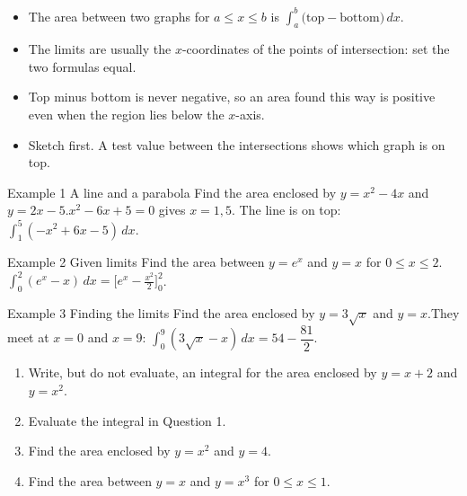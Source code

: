 \documentclass[11pt]{article}
\begin{document}

\begin{ideabox}
\begin{itemize}[leftmargin=*,itemsep=2pt,topsep=2pt]
  \item The area between two graphs for $a\le x\le b$ is $\displaystyle\int_{a}^{b}\big(\text{top}-\text{bottom}\big)\,dx$.
  \item The limits are usually the $x$-coordinates of the points of intersection: set the two formulas equal.
  \item Top minus bottom is never negative, so an area found this way is positive even when the region lies below the $x$-axis.
  \item Sketch first. A test value between the intersections shows which graph is on top.
\end{itemize}
\end{ideabox}

\begin{example}{Example 1 \textperiodcentered{} A line and a parabola}
Find the area enclosed by $y=x^2-4x$ and $y=2x-5$.\soln $x^2-6x+5=0$ gives $x=1,5$. The line is on top: $\displaystyle\int_{1}^{5}(-x^2+6x-5)\,dx$.
\end{example}

\begin{example}{Example 2 \textperiodcentered{} Given limits}
Find the area between $y=e^{x}$ and $y=x$ for $0\le x\le2$.\soln $\displaystyle\int_{0}^{2}(e^{x}-x)\,dx=\Big[e^{x}-\tfrac{x^2}{2}\Big]_0^2$.
\end{example}

\begin{example}{Example 3 \textperiodcentered{} Finding the limits}
Find the area enclosed by $y=3\sqrt{x}$ and $y=x$.\soln They meet at $x=0$ and $x=9$: $\displaystyle\int_{0}^{9}\left(3\sqrt x-x\right)\,dx=54-\dfrac{81}{2}$.
\end{example}

\newpage
{}

\begin{enumerate}[leftmargin=*,itemsep=2pt]
  \item Write, but do not evaluate, an integral for the area enclosed by $y=x+2$ and $y=x^2$.\work{2.3cm}
  \item Evaluate the integral in Question 1.\work{2.3cm}
  \item Find the area enclosed by $y=x^2$ and $y=4$.\work{2.3cm}
  \item Find the area between $y=x$ and $y=x^3$ for $0\le x\le1$.\work{2.3cm}
\end{enumerate}
\end{document}
